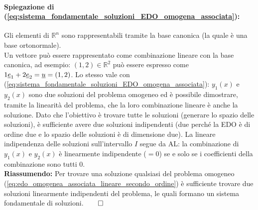 \paragraph{Spiegazione di (\ref{eq:sistema_fondamentale_soluzioni_EDO_omogena_associata}):} Gli elementi di $\mathbb R^n$ sono rappresentabili tramite la base canonica (la quale è una \gls{base ortonormale}).\\
Un vettore può essere rappresentato come combinazione lineare con la base canonica, ad esempio: $(1,2)\in\mathbb R^2$ può essere espresso come $1\uline e_1 + 2\uline e_2=\uline u=(1,2)$. Lo stesso vale con (\ref{eq:sistema_fondamentale_soluzioni_EDO_omogena_associata}): $y_1(x)$ e $y_2(x)$ sono due soluzioni del problema omogeneo ed è possibile dimostrare, tramite la linearità del problema, che la loro combinazione lineare è anche la soluzione. Dato che l'obiettivo è trovare tutte le soluzioni (generare lo spazio delle soluzioni), è sufficiente avere due soluzioni indipendenti (due perché la EDO è di ordine due e lo spazio delle soluzioni è di dimensione due). La lineare indipendenza delle soluzioni sull'intervallo $I$ segue da AL:  la combinazione di $y_1(x)$ e $y_2(x)$ è linearmente indipendente ($=0$) se e solo se i coefficienti della combinazione sono tutti 0.\\
\textbf{Riassumendo: }Per trovare una soluzione qualsiasi del problema omogeneo (\ref{eq:edo_omogenea_associata_lineare_secondo_ordine}) è sufficiente trovare due soluzioni linearmente indipendenti del problema, le quali formano un sistema fondamentale di soluzioni.$\qed$


